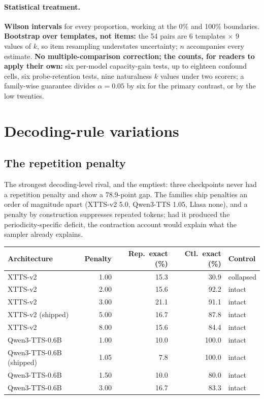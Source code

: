 \paragraph{Statistical treatment.} \textbf{Wilson intervals} for every proportion, working at
the 0\% and 100\% boundaries. \textbf{Bootstrap over templates, not items:} the 54 pairs are 6
templates $\times$ 9 values of $k$, so item resampling understates uncertainty; $n$ accompanies
every estimate. \textbf{No multiple-comparison correction; the counts, for readers to apply
their own:} six per-model capacity-gain tests, up to eighteen confound cells, six
probe-retention tests, nine naturalness $k$ values under two scorers; a family-wise guarantee
divides $\alpha{=}0.05$ by six for the primary contrast, or by the low twenties.


\section{Decoding-rule variations}
\label{sec:decoding}
\subsection{The repetition penalty}
\label{sec:penalty}

The strongest decoding-level rival, and the emptiest: three checkpoints never had a repetition
penalty and show a 78.9-point gap. The families ship penalties an order of magnitude apart
(XTTS-v2 5.0, Qwen3-TTS 1.05, Llasa none), and a penalty by construction suppresses repeated
tokens; had it produced the periodicity-specific deficit, the contraction account would explain what the
sampler already explains.

\begin{center}
\begin{tabular}{@{}lrrrl@{}}
\toprule
Architecture & Penalty & Rep.\ exact (\%) & Ctl.\ exact (\%) & Control \\
\midrule
XTTS-v2 & 1.00 & 15.3 & 30.9 & collapsed \\
XTTS-v2 & 2.00 & 15.6 & 92.2 & intact \\
XTTS-v2 & 3.00 & 21.1 & 91.1 & intact \\
XTTS-v2 (shipped) & 5.00 & 16.7 & 87.8 & intact \\
XTTS-v2 & 8.00 & 15.6 & 84.4 & intact \\
Qwen3-TTS-0.6B & 1.00 & 10.0 & 100.0 & intact \\
Qwen3-TTS-0.6B (shipped) & 1.05 & 7.8 & 100.0 & intact \\
Qwen3-TTS-0.6B & 1.50 & 10.0 & 80.0 & intact \\
Qwen3-TTS-0.6B & 3.00 & 16.7 & 83.3 & intact \\
\bottomrule
\end{tabular}
\end{center}

